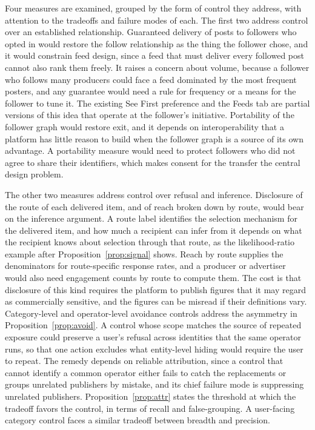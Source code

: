 \documentclass[11pt]{article}
\theoremstyle{definition}
\begin{document}
Four measures are examined, grouped by the form of control they address, with attention to the tradeoffs and failure modes of each. The first two address control over an established relationship. Guaranteed delivery of posts to followers who opted in would restore the follow relationship as the thing the follower chose, and it would constrain feed design, since a feed that must deliver every followed post cannot also rank them freely. It raises a concern about volume, because a follower who follows many producers could face a feed dominated by the most frequent posters, and any guarantee would need a rule for frequency or a means for the follower to tune it. The existing See First preference and the Feeds tab are partial versions of this idea that operate at the follower's initiative. Portability of the follower graph would restore exit, and it depends on interoperability that a platform has little reason to build when the follower graph is a source of its own advantage. A portability measure would need to protect followers who did not agree to share their identifiers, which makes consent for the transfer the central design problem.

The other two measures address control over refusal and inference. Disclosure of the route of each delivered item, and of reach broken down by route, would bear on the inference argument. A route label identifies the selection mechanism for the delivered item, and how much a recipient can infer from it depends on what the recipient knows about selection through that route, as the likelihood-ratio example after Proposition~\ref{prop:signal} shows. Reach by route supplies the denominators for route-specific response rates, and a producer or advertiser would also need engagement counts by route to compute them. The cost is that disclosure of this kind requires the platform to publish figures that it may regard as commercially sensitive, and the figures can be misread if their definitions vary. Category-level and operator-level avoidance controls address the asymmetry in Proposition~\ref{prop:avoid}. A control whose scope matches the source of repeated exposure could preserve a user's refusal across identities that the same operator runs, so that one action excludes what entity-level hiding would require the user to repeat. The remedy depends on reliable attribution, since a control that cannot identify a common operator either fails to catch the replacements or groups unrelated publishers by mistake, and its chief failure mode is suppressing unrelated publishers. Proposition~\ref{prop:attr} states the threshold at which the tradeoff favors the control, in terms of recall and false-grouping. A user-facing category control faces a similar tradeoff between breadth and precision.
\end{document}
